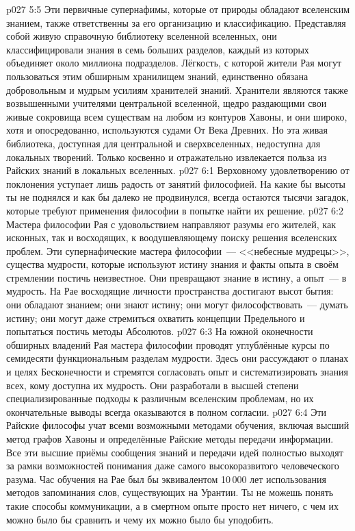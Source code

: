 \vs p027 5:5 Эти первичные супернафимы, которые от природы обладают вселенским знанием, также ответственны за его организацию и классификацию. Представляя собой живую справочную библиотеку вселенной вселенных, они классифицировали знания в семь больших разделов, каждый из которых объединяет около миллиона подразделов. Лёгкость, с которой жители Рая могут пользоваться этим обширным хранилищем знаний, единственно обязана добровольным и мудрым усилиям хранителей знаний. Хранители являются также возвышенными учителями центральной вселенной, щедро раздающими свои живые сокровища всем существам на любом из контуров Хавоны, и они широко, хотя и опосредованно, используются судами От Века Древних. Но эта живая библиотека, доступная для центральной и сверхвселенных, недоступна для локальных творений. Только косвенно и отражательно извлекается польза из Райских знаний в локальных вселенных.
\vs p027 6:1 Верховному удовлетворению от поклонения уступает лишь радость от занятий философией. На какие бы высоты ты не поднялся и как бы далеко не продвинулся, всегда остаются тысячи загадок, которые требуют применения философии в попытке найти их решение.
\vs p027 6:2 Мастера философии Рая с удовольствием направляют разумы его жителей, как исконных, так и восходящих, к воодушевляющему поиску решения вселенских проблем. Эти супернафические мастера философии~--- <<небесные мудрецы>>, существа мудрости, которые используют истину знания и факты опыта в своём стремлении постичь неизвестное. Они превращают знание в истину, а опыт~--- в мудрость. На Рае восходящие личности пространства достигают высот бытия: они обладают знанием; они знают истину; они могут философствовать~--- думать истину; они могут даже стремиться охватить концепции Предельного и попытаться постичь методы Абсолютов.
\vs p027 6:3 На южной оконечности обширных владений Рая мастера философии проводят углублённые курсы по семидесяти функциональным разделам мудрости. Здесь они рассуждают о планах и целях Бесконечности и стремятся согласовать опыт и систематизировать знания всех, кому доступна их мудрость. Они разработали в высшей степени специализированные подходы к различным вселенским проблемам, но их окончательные выводы всегда оказываются в полном согласии.
\vs p027 6:4 Эти Райские философы учат всеми возможными методами обучения, включая высший метод графов Хавоны и определённые Райские методы передачи информации. Все эти высшие приёмы сообщения знаний и передачи идей полностью выходят за рамки возможностей понимания даже самого высокоразвитого человеческого разума. Час обучения на Рае был бы эквивалентом 10\,000 лет использования методов запоминания слов, существующих на Урантии. Ты не можешь понять такие способы коммуникации, а в смертном опыте просто нет ничего, с чем их можно было бы сравнить и чему их можно было бы уподобить.
